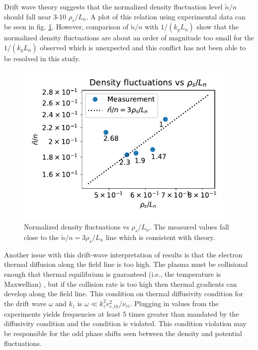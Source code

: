 Drift wave theory\cite{Liewer_measurements_1985} suggests that the normalized density fluctuation level $\widetilde n / n$ should fall near 3-10 $\rho_s / L_n$. A plot of this relation using experimental data can be seen in fig. \ref{fig_extra:density-fluct_vs_rhos-Ln}. However, comparison of $\widetilde n / n$ with $1/(k_y L_n)$ show that the normalized density fluctuations are about an order of magnitude too small for the $1/(k_y L_n)$ observed which is unexpected and this conflict has not been able to be resolved in this study. 

\begin{figure}
    \centering
    \includegraphics[width=300pt]{figures/extra/density-fluct_vs_rhos-Ln.pdf}
    \caption[Normalized density fluctuations vs $\rho_s / L_n$]{Normalized density fluctuations vs $\rho_s / L_n$. The measured values fall close to the $\tilde{n}/n = 3 \rho_s / L_n$ line which is consistent with theory.}
    \label{fig_extra:density-fluct_vs_rhos-Ln}
\end{figure}

Another issue with this drift-wave interpretation of results is that the electron thermal diffusion along the field line is too high. The plasma must be collisional enough that thermal equilibrium is guaranteed (i.e., the temperature is Maxwellian) , but if the collision rate is too high then thermal gradients can develop along the field line\cite{Goldston_textbook}. This condition on thermal diffusivity condition for the drift wave $\omega$ and $k_z$ is $\omega \ll k_z^2 v_{e, th}^2 / \nu_{ei}$. Plugging in values from the experiments yields frequencies at least 5 times greater than mandated by the diffusivity condition and the condition is violated. This condition violation may be responsible for the odd phase shifts seen between the density and potential fluctuations.

